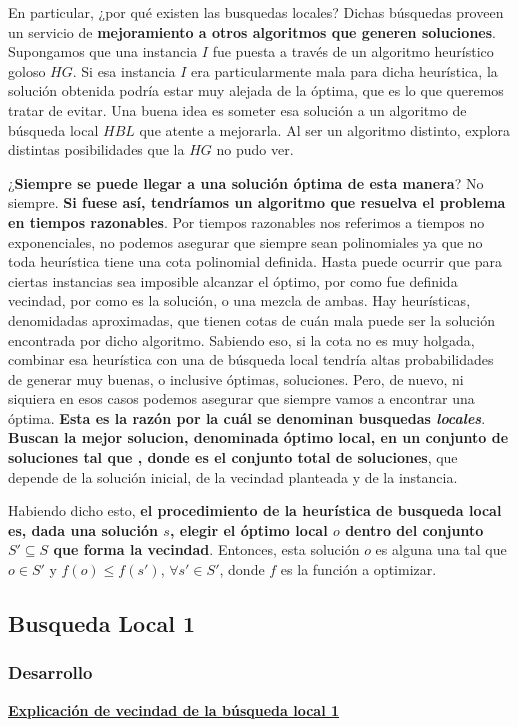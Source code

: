 \documentclass[10pt,a4paper]{article}
\begin{document}
En particular, ¿por qué existen las busquedas locales? Dichas búsquedas proveen un servicio de \textbf{mejoramiento a otros algoritmos que generen soluciones}. Supongamos que una instancia $I$ fue puesta a través de un algoritmo heurístico goloso $HG$. Si esa instancia $I$ era particularmente mala para dicha heurística, la solución obtenida podría estar muy alejada de la óptima, que es lo que queremos tratar de evitar. Una buena idea es someter esa solución a un algoritmo de búsqueda local $HBL$ que atente a mejorarla. Al ser un algoritmo distinto, explora distintas posibilidades que la $HG$ no pudo ver.

¿\textbf{Siempre se puede llegar a una solución óptima de esta manera}? No siempre. \textbf{Si fuese así, tendríamos un algoritmo que resuelva el problema en tiempos razonables}. Por tiempos razonables nos referimos a tiempos no exponenciales, no podemos asegurar que siempre sean polinomiales ya que no toda heurística tiene una cota polinomial definida. Hasta puede ocurrir que para ciertas instancias sea imposible alcanzar el óptimo, por como fue definida vecindad, por como es la solución, o una mezcla de ambas. Hay heurísticas, denomidadas aproximadas, que tienen cotas de cuán mala puede ser la solución encontrada por dicho algoritmo. Sabiendo eso, si la cota no es muy holgada, combinar esa heurística con una de búsqueda local tendría altas probabilidades de generar muy buenas, o inclusive óptimas, soluciones. Pero, de nuevo, ni siquiera en esos casos podemos asegurar que siempre vamos a encontrar una óptima. \textbf{Esta es la razón por la cuál se denominan busquedas \textit{locales}}. \textbf{Buscan la mejor solucion, denominada óptimo local, en un conjunto  de soluciones tal que , donde  es el conjunto total de soluciones}, que depende de la solución inicial, de la vecindad planteada y de la instancia.

Habiendo dicho esto, \textbf{el procedimiento de la heurística de busqueda local es, dada una solución $s$, elegir el óptimo local $o$ dentro del conjunto $S' \subseteq S$ que forma la vecindad}. Entonces, esta solución $o$ es alguna una tal que $o \in S'$ y $f(o) \leq f(s')$, $\forall s' \in S'$, donde $f$ es la función a optimizar.

\newpage
\subsection{Busqueda Local 1}
\subsubsection{Desarrollo}
\noindent \textbf{\underline{Explicación de vecindad de la búsqueda local 1}}
\end{document}
